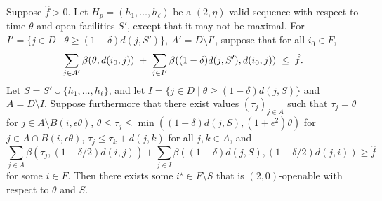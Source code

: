 \begin{lemma}
\label{lem:pay-to-open-2}
Suppose $\hat f > 0$.
Let $H_p = (h_1, \ldots, h_\ell)$ be a $(2,\eta)$-valid sequence with respect to time $\theta$ and open facilities $S'$, except that it may not be maximal.
For $I' = \{j \in D \mid \theta \geq (1-\delta) d(j, S')\}$, $A' = D \setminus I'$, suppose that for all $i_0 \in F$,
    \[\sum_{j\in A'}\beta(\theta,d(i_0,j))
\;+\;
\sum_{j\in I'}\beta((1-\delta)  d(j,S'), d(i_0,j))
\;\le\; \hat f.\]
Let $S = S' \cup \{h_1, \ldots, h_{\ell}\}$, and let $I = \{j \in D \mid \theta \geq (1-\delta) d(j, S)\}$ and $A = D \setminus I$.
Suppose furthermore that there exist values $(\tau_j)_{j \in A}$ such that $\tau_j = \theta$ for $j \in A \setminus B(i, \epsilon \theta)$, $\theta \leq \tau_j \leq \min((1-\delta)d(j,S), (1+\epsilon^2)\theta)$ for $j \in A \cap B(i, \epsilon \theta)$, $\tau_j \leq \tau_k + d(j, k)$ for all $j, k \in A$, and
\[\sum_{j \in A} \beta(\tau_j, (1-\delta/2) d(i, j)) + \sum_{j \in I}\beta((1-\delta)d(j,S), (1-\delta/2)d(j, i)) \geq \hat{f}\]
for some $i \in F$. Then there exists some $i^\star \in F \setminus S$ that is $(2,0)$-openable with respect to $\theta$ and $S$.
\end{lemma}
